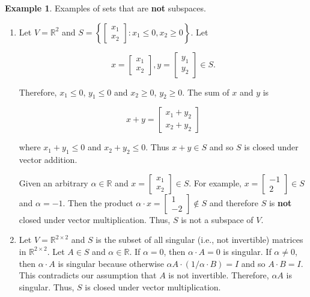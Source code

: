 \documentclass[12pt]{article}
\theoremstyle{definition}
\newtheorem*{example}{Example}
\begin{document}
\begin{example}

Examples of sets that are \textbf{not} subspaces.

\begin{enumerate}[label = (\arabic*)]

\item Let $V = \mathbb{R}^2$ and 
$S = \left\{ \begin{bmatrix} x_1 \\ x_2 \end{bmatrix} : x_1 \leq 0, x_2 \geq 0 \right\}$.
Let 

\[ x = \begin{bmatrix} x_1 \\ x_2 \end{bmatrix}, y = \begin{bmatrix} y_1 \\ y_2 \end{bmatrix} \in S. \]

Therefore, $x_1 \leq 0$, $y_1 \leq 0$ and $x_2 \geq 0$, $y_2 \geq 0$. The sum of $x$ and $y$ is

\[
x + y =
\begin{bmatrix}
x_1 + y_2 \\
x_2 + y_2
\end{bmatrix}
\]

where $x_1 + y_1 \leq 0$ and $x_2 + y_2 \leq 0$. Thus $x + y \in S$ and so $S$ is closed under
vector addition.

Given an arbitrary $\alpha \in \mathbb{R}$ and $x = \begin{bmatrix} x_1 \\ x_2 \end{bmatrix} \in S$.
For example, $x = \begin{bmatrix} -1 \\ 2 \end{bmatrix} \in S$ and $\alpha = -1$. Then the product
$\alpha \cdot x = \begin{bmatrix} 1 \\ -2 \end{bmatrix} \notin S$ and therefore $S$ is \textbf{not}
closed under vector multiplication. Thus, $S$ is not a subspace of $V$.

\item Let $V = \mathbb{R}^{2 \times 2}$ and $S$ is the subset of all singular (i.e., not
invertible) matrices in $\mathbb{R}^{2 \times 2}$. Let $A \in S$ and $\alpha \in \mathbb{R}$. If
$\alpha = 0$, then $\alpha \cdot A = 0$ is singular. If $\alpha \neq 0$, then $\alpha \cdot A$ is
singular because otherwise $\alpha A \cdot (1/\alpha \cdot B) = I$ and so $A \cdot B = I$. 
This contradicts our assumption that $A$ is not invertible. Therefore, $\alpha A$ is singular.
Thus, $S$ is closed under vector multiplication.


\end{enumerate}
\end{example}
\end{document}
